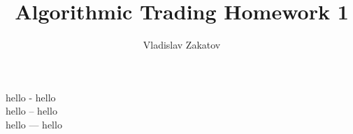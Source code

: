 \documentclass{article}
\title{Algorithmic Trading Homework 1}
\author{Vladislav Zakatov}
\date{}
\begin{document}
hello - hello\\
hello -- hello\\
hello --- hello
\end{document}
